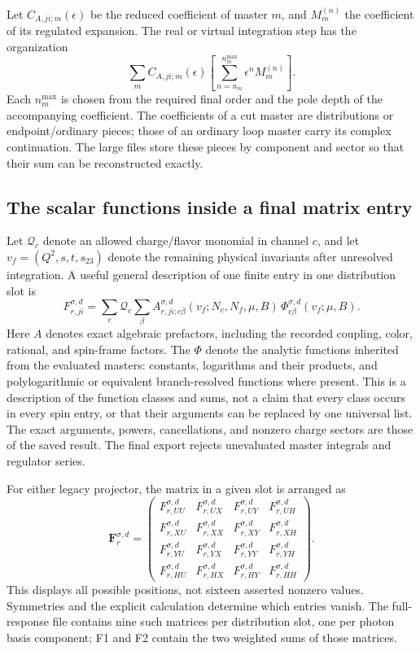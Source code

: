\documentclass[11pt,a4paper]{article}
\newcommand{\eps}{\epsilon}
\begin{document}
Let $C_{A,ji;m}(\eps)$ be the reduced coefficient of master $m$, and $M_m^{(n)}$ the coefficient of its regulated expansion. The real or virtual integration step has the organization
\begin{equation}
 \sum_m C_{A,ji;m}(\eps)
   \left[\sum_{n=n_m}^{n_m^{\max}}\eps^n M_m^{(n)}\right].
\end{equation}
Each $n_m^{\max}$ is chosen from the required final order and the pole depth of the accompanying coefficient. The coefficients of a cut master are distributions or endpoint/ordinary pieces; those of an ordinary loop master carry its complex continuation. The large files store these pieces by component and sector so that their sum can be reconstructed exactly.

\subsection{The scalar functions inside a final matrix entry}
Let $\mathcal Q_c$ denote an allowed charge/flavor monomial in channel $c$, and let $v_f=(Q^2,s,t,s_{23})$ denote the remaining physical invariants after unresolved integration. A useful general description of one finite entry in one distribution slot is
\begin{equation}
 F_{r,ji}^{\sigma,d}
 =\sum_c\mathcal Q_c\sum_{\beta}
 A_{r,ji;c\beta}^{\sigma,d}(v_f;N_c,N_f,\mu,B)\,
 \Phi_{c\beta}^{\sigma,d}(v_f;\mu,B).
\end{equation}
Here $A$ denotes exact algebraic prefactors, including the recorded coupling, color, rational, and spin-frame factors. The $\Phi$ denote the analytic functions inherited from the evaluated masters: constants, logarithms and their products, and polylogarithmic or equivalent branch-resolved functions where present. This is a description of the function classes and sums, not a claim that every class occurs in every spin entry, or that their arguments can be replaced by one universal list. The exact arguments, powers, cancellations, and nonzero charge sectors are those of the saved result. The final export rejects unevaluated master integrals and regulator series.

For either legacy projector, the matrix in a given slot is arranged as
\begin{equation}
 \bm F_r^{\sigma,d}=\begin{pmatrix}
 F_{r,UU}^{\sigma,d}&F_{r,UX}^{\sigma,d}&F_{r,UY}^{\sigma,d}&F_{r,UH}^{\sigma,d}\\
 F_{r,XU}^{\sigma,d}&F_{r,XX}^{\sigma,d}&F_{r,XY}^{\sigma,d}&F_{r,XH}^{\sigma,d}\\
 F_{r,YU}^{\sigma,d}&F_{r,YX}^{\sigma,d}&F_{r,YY}^{\sigma,d}&F_{r,YH}^{\sigma,d}\\
 F_{r,HU}^{\sigma,d}&F_{r,HX}^{\sigma,d}&F_{r,HY}^{\sigma,d}&F_{r,HH}^{\sigma,d}
 \end{pmatrix}.
\end{equation}
This displays all possible positions, not sixteen asserted nonzero values. Symmetries and the explicit calculation determine which entries vanish. The full-response file contains nine such matrices per distribution slot, one per photon basis component; F1 and F2 contain the two weighted sums of those matrices.
\end{document}
